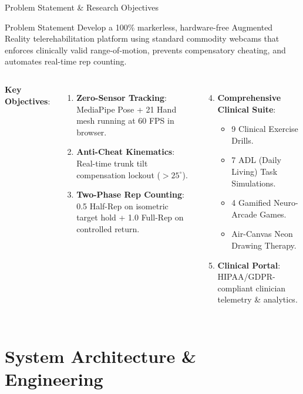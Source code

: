\documentclass{beamer}
\begin{document}
\begin{frame}{Problem Statement \& Research Objectives}
\begin{block}{Problem Statement}
Develop a 100\% markerless, hardware-free Augmented Reality telerehabilitation platform using standard commodity webcams that enforces clinically valid range-of-motion, prevents compensatory cheating, and automates real-time rep counting.
\end{block}

\vspace{2mm}
\begin{columns}
\textbf{Key Objectives}:
\begin{enumerate}
    \item \textbf{Zero-Sensor Tracking}: MediaPipe Pose + 21 Hand mesh running at 60 FPS in browser.
    \item \textbf{Anti-Cheat Kinematics}: Real-time trunk tilt compensation lockout ($>25^\circ$).
    \item \textbf{Two-Phase Rep Counting}: 0.5 Half-Rep on isometric target hold + 1.0 Full-Rep on controlled return.
\end{enumerate}

\begin{enumerate}
    \setcounter{enumi}{3}
    \item \textbf{Comprehensive Clinical Suite}:
    \begin{itemize}
        \item 9 Clinical Exercise Drills.
        \item 7 ADL (Daily Living) Task Simulations.
        \item 4 Gamified Neuro-Arcade Games.
        \item Air-Canvas Neon Drawing Therapy.
    \end{itemize}
    \item \textbf{Clinical Portal}: HIPAA/GDPR-compliant clinician telemetry \& analytics.
\end{enumerate}
\end{columns}
\end{frame}

\section{System Architecture \& Engineering}
\end{document}
